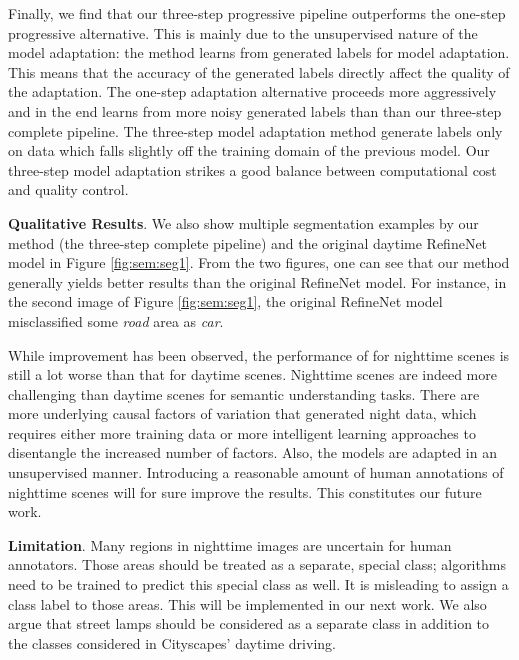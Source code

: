 \documentclass[letterpaper, 10 pt, conference]{ieeeconf}
\begin{document}
Finally, we find that our three-step progressive pipeline outperforms the one-step progressive alternative. This is mainly due to the unsupervised nature of the model adaptation: the method learns from generated labels for model adaptation. This means that the accuracy of the generated labels directly affect the quality of the adaptation. The one-step adaptation alternative proceeds more aggressively and in the end learns from more noisy generated labels than than our three-step complete pipeline. The three-step model adaptation method generate labels only on data which falls slightly off the training domain of the previous model.
Our three-step model adaptation strikes a good balance between computational cost and quality control.  
 
\textbf{Qualitative Results}. We also show multiple segmentation examples by our method (the three-step complete pipeline) and the original daytime RefineNet model in Figure \ref{fig:sem:seg1}. From the two figures, one can see that our method generally yields better results than the original RefineNet model. For instance, in the second image of Figure \ref{fig:sem:seg1}, the original RefineNet model misclassified some \emph{road} area as \emph{car}. 

While improvement has been observed, the  performance of for nighttime scenes is still a lot worse than that for daytime scenes. Nighttime scenes are indeed more challenging than daytime scenes for semantic understanding tasks. There are more underlying causal factors of variation that generated night data, which requires either more
training data or more intelligent learning approaches to disentangle
the increased number of factors. Also, the models are adapted in an unsupervised manner. Introducing a reasonable amount of human annotations of nighttime scenes will for sure improve the results. This constitutes our future work. 

\textbf{Limitation}.
Many regions in nighttime images are uncertain for human annotators. Those areas should be treated as a separate, special class; algorithms need to be trained to predict this special class as well. It is misleading to assign a class label to those areas. This will be implemented in our next work. We also argue that street lamps should be considered as a separate class in addition to the classes considered in Cityscapes' daytime driving.
\end{document}
